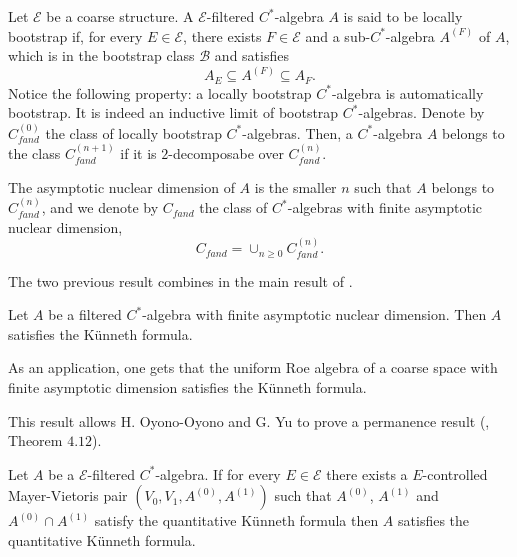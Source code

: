 \begin{frame}
Let $\mathcal E$ be a coarse structure. A $\mathcal E$-filtered $C^*$-algebra $A$ is said to be locally bootstrap if, for every $E\in \mathcal E$, there exists $F\in \mathcal E$ and a sub-$C^*$-algebra $A^{(F)}$ of $A$, which is in the bootstrap class $\mathcal B$ and satisfies
\[A_E \subseteq A^{(F)}\subseteq A_F. \]
Notice the following property: a locally bootstrap $C^*$-algebra is automatically bootstrap. It is indeed an inductive limit of bootstrap $C^*$-algebras. Denote by $C_{fand}^{(0)}$ the class of locally bootstrap $C^*$-algebras. Then, a $C^*$-algebra $A$ belongs to the class $C^{(n+1)}_{fand}$ if it is $2$-decomposabe over $C_{fand}^{(n)}$. \\
\end{frame}

\begin{frame}
The asymptotic nuclear dimension of $A$ is the smaller $n$ such that $A$ belongs to $C^{(n)}_{fand}$, and we denote by $C_{fand}$ the class of $C^*$-algebras with finite asymptotic nuclear dimension,
\[ C_{fand}  = \cup_{n\geq 0} C_{fand}^{(n)}.\]

The two previous result combines in the main result of \cite{OY4}.
\begin{thmfr}
Let $A$ be a filtered $C^*$-algebra with finite asymptotic nuclear dimension. Then $A$ satisfies the Künneth formula. \end{thmfr}

As an application, one gets that the uniform Roe algebra of a coarse space with finite asymptotic dimension satisfies the Künneth formula.\\
\end{frame}

\begin{frame}
This result allows H. Oyono-Oyono and G. Yu to prove a permanence result (\cite{OY4}, Theorem $4.12$).
\begin{thmfr}
Let $A$ be a $\mathcal E$-filtered $C^*$-algebra. If for every $E\in \mathcal E$ there exists a $E$-controlled Mayer-Vietoris pair $(V_0, V_1, A^{(0)}, A^{(1)})$ such that $A^{(0)}$, $A^{(1)}$ and $A^{(0)} \cap A^{(1)}$ satisfy the quantitative Künneth formula then $A$ satisfies the quantitative Künneth formula.   
\end{thmfr}
\end{frame}
